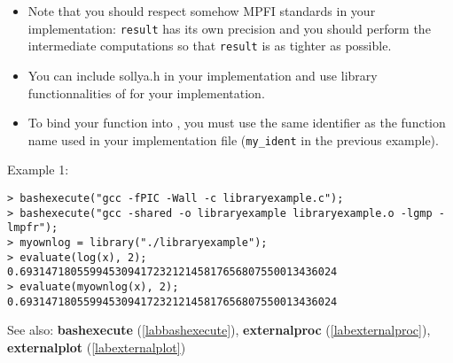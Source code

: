 \begin{itemize}
\item Note that you should respect somehow MPFI standards in your implementation:
   \verb|result| has its own precision and you should perform the 
   intermediate computations so that \verb|result| is as tighter as possible.

\item You can include sollya.h in your implementation and use library 
   functionnalities of \sollya for your implementation.

\item To bind your function into \sollya, you must use the same identifier as the
   function name used in your implementation file (\verb|my_ident| in the previous
   example).
\end{itemize}
\noindent Example 1: 
\begin{center}\begin{minipage}{15cm}\begin{Verbatim}[frame=single]
> bashexecute("gcc -fPIC -Wall -c libraryexample.c");
> bashexecute("gcc -shared -o libraryexample libraryexample.o -lgmp -lmpfr");
> myownlog = library("./libraryexample");
> evaluate(log(x), 2);
0.69314718055994530941723212145817656807550013436024
> evaluate(myownlog(x), 2);
0.69314718055994530941723212145817656807550013436024
\end{Verbatim}
\end{minipage}\end{center}
See also: \textbf{bashexecute} (\ref{labbashexecute}), \textbf{externalproc} (\ref{labexternalproc}), \textbf{externalplot} (\ref{labexternalplot})
